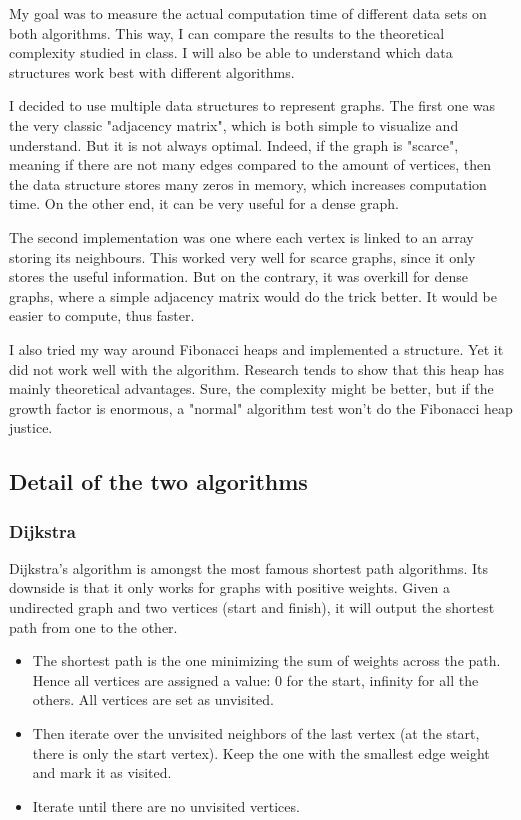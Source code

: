 \documentclass{article}
\begin{document}
My goal was to measure the actual computation time of different data sets on both algorithms. This way, I can compare the results to the theoretical complexity studied in class. I will also be able to understand which data structures work best with different algorithms.

I decided to use multiple data structures to represent graphs. The first one was the very classic "adjacency matrix", which is both simple to visualize and understand. But it is not always optimal. Indeed, if the graph is "scarce", meaning if there are not many edges compared to the amount of vertices, then the data structure stores many zeros in memory, which increases computation time. On the other end, it can be very useful for a dense graph.

The second implementation was one where each vertex is linked to an array storing its neighbours. This worked very well for scarce graphs, since it only stores the useful information. But on the contrary, it was overkill for dense graphs, where a simple adjacency matrix would do the trick better. It would be easier to compute, thus faster.

I also tried my way around Fibonacci heaps and implemented a structure. Yet it did not work well with the algorithm. Research tends to show that this heap has mainly theoretical advantages. Sure, the complexity might be better, but if the growth factor is enormous, a "normal" algorithm test won't do the Fibonacci heap justice.

\subsection{Detail of the two algorithms}

\subsubsection{Dijkstra}

Dijkstra's algorithm is amongst the most famous shortest path algorithms. Its downside is that it only works for graphs with positive weights. Given a undirected graph and two vertices (start and finish), it will output the shortest path from one to the other.

\begin{itemize}
\item
	The shortest path is the one minimizing the sum of weights across the path. Hence all vertices are assigned a value: 0 for the start, infinity for all the others. All vertices are set as unvisited. 
\item
	Then iterate over the unvisited neighbors of the last vertex (at the start, there is only the start vertex). Keep the one with the smallest edge weight and mark it as visited.
\item
	Iterate until there are no unvisited vertices.
\end{itemize}
\end{document}
